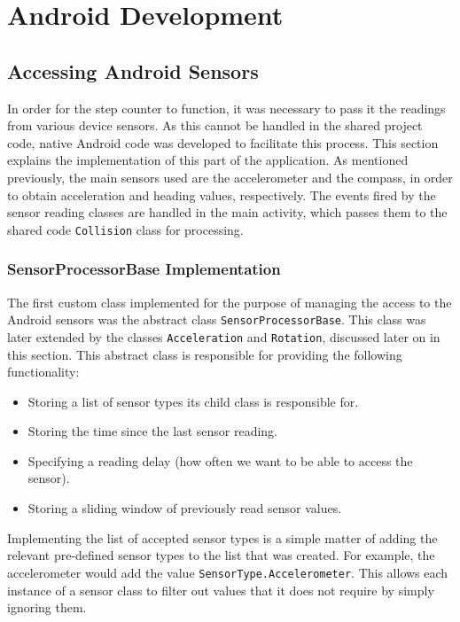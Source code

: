 \documentclass[12pt,a4paper]{report}
\begin{document}
\section{Android Development}
    \subsection{Accessing Android Sensors}
        In order for the step counter to function, it was necessary to pass it the readings from various device sensors. As this cannot be handled in the shared
        project code, native Android code was developed to facilitate this process. This section explains the implementation of this part of the application. As
        mentioned previously, the main sensors used are the accelerometer and the compass, in order to obtain acceleration and heading values, respectively.
        The events fired by the sensor reading classes are handled in the main activity, which passes them to the shared code \texttt{Collision} class for processing.
        \subsubsection{SensorProcessorBase Implementation}
            The first custom class implemented for the purpose of managing the access to the Android sensors was the abstract class
            \texttt{SensorProcessorBase}. This class was later extended by the classes \texttt{Acceleration} and \texttt{Rotation}, discussed
            later on in this section. This abstract class is responsible for providing the following functionality:
            \begin{itemize}
                \item Storing a list of sensor types its child class is responsible for.
                \item Storing the time since the last sensor reading.
                \item Specifying a reading delay (how often we want to be able to access the sensor).
                \item Storing a sliding window of previously read sensor values.
            \end{itemize}
            Implementing the list of accepted sensor types is a simple matter of adding the relevant pre-defined sensor types to the list that was created. For example,
            the accelerometer would add the value \texttt{SensorType.Accelerometer}. This allows each instance of a sensor class to filter out values that it does not
            require by simply ignoring them.
            
\end{document}
